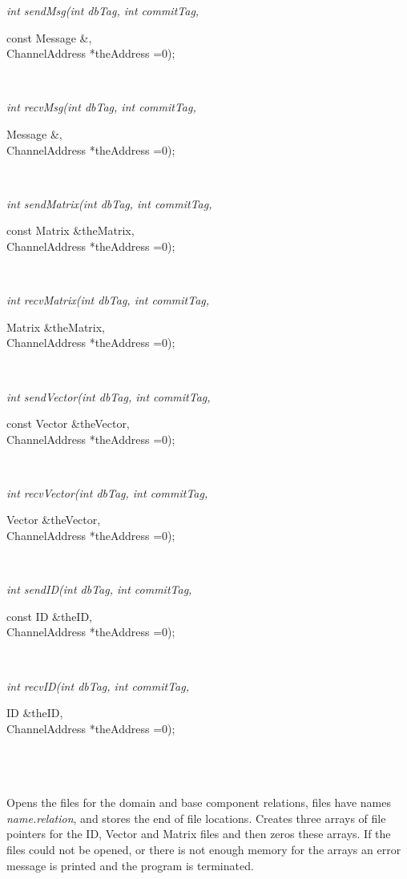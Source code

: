 {\em int sendMsg(int dbTag, int commitTag,  

\indent\indent\indent\indent\indent		const Message \&, \\
\indent\indent\indent\indent\indent		ChannelAddress *theAddress =0);}\\
{\em int recvMsg(int dbTag, int commitTag, 

\indent\indent\indent\indent\indent		Message \&, \\
\indent\indent\indent\indent\indent		ChannelAddress *theAddress =0);}\\
{\em int sendMatrix(int dbTag, int commitTag,  

\indent\indent\indent\indent\indent		   const Matrix \&theMatrix, \\
\indent\indent\indent\indent\indent		   ChannelAddress *theAddress =0);}\\
{\em int recvMatrix(int dbTag, int commitTag, 

\indent\indent\indent\indent\indent		   Matrix \&theMatrix,  \\
\indent\indent\indent\indent\indent		   ChannelAddress *theAddress =0);}\\
{\em int sendVector(int dbTag, int commitTag, 

\indent\indent\indent\indent\indent const Vector \&theVector, \\
\indent\indent\indent\indent\indent ChannelAddress *theAddress =0);}\\
{\em int recvVector(int dbTag, int commitTag,  

\indent\indent\indent\indent\indent		   Vector \&theVector,  \\
\indent\indent\indent\indent\indent		   ChannelAddress *theAddress =0);}\\
{\em int sendID(int dbTag, int commitTag, 

\indent\indent\indent\indent\indent	   const ID \&theID, \\
\indent\indent\indent\indent\indent	   ChannelAddress *theAddress =0);}\\
{\em int recvID(int dbTag, int commitTag, 

\indent\indent\indent\indent\indent	   ID \&theID, \\
\indent\indent\indent\indent\indent	   ChannelAddress *theAddress =0);}\\


  \\
  \\ 
Opens the files for the domain and base component relations, files have names {\em
name.relation}, and stores the end of file locations. Creates three arrays
of file pointers for the ID, Vector and Matrix files and then zeros
these arrays. If the files could not be opened, or there is not enough
memory for the arrays an error message is printed and the program
is terminated. \\

